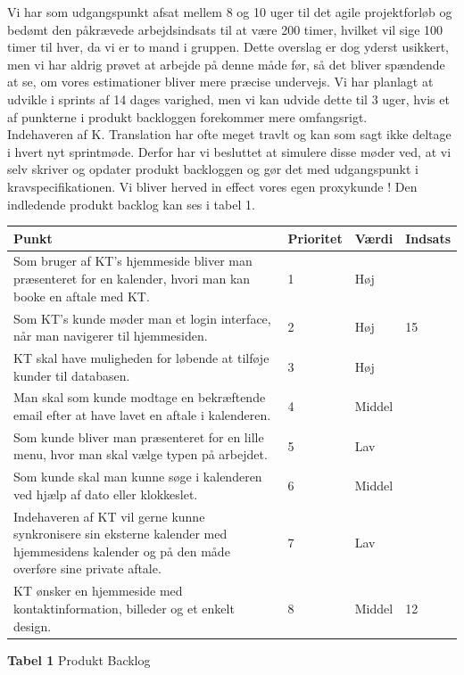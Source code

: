 \documentclass[12pt]{article}   %
\begin{document}
Vi har som udgangspunkt afsat mellem 8 og 10 uger til det agile projektforløb
og bedømt den påkrævede arbejdsindsats til at være 200 timer, hvilket vil sige 100
timer til hver, da vi er to mand i gruppen. Dette overslag er dog yderst
usikkert, men vi har aldrig prøvet at arbejde på denne måde før, så det bliver
spændende at se, om vores estimationer bliver mere præcise undervejs. Vi har
planlagt at udvikle i sprints af 14 dages varighed, men vi kan udvide dette til 3
uger, hvis et af punkterne i produkt backloggen forekommer mere omfangsrigt.\\
Indehaveren af K. Translation har ofte meget travlt og kan som sagt ikke
deltage i hvert nyt sprintmøde. Derfor har vi besluttet at simulere disse
møder ved, at vi selv skriver og opdater produkt backloggen og gør det med
udgangspunkt i kravspecifikationen. Vi bliver herved in effect vores egen 
proxykunde ! Den indledende produkt backlog kan ses i tabel 1.

\begin{center}
	\begin{tabular}{|p{8cm}|l|l|l|}
		\hline
Punkt & Prioritet & Værdi & Indsats \\ \hline
Som bruger af KT's hjemmeside bliver man præsenteret for en kalender, hvori man
kan booke en aftale med KT. & 1 & Høj &     \\ \hline
Som KT's kunde møder man et login interface, når man navigerer til hjemmesiden. & 2 &
Høj & 15  \\ \hline
KT skal have muligheden for løbende at tilføje kunder til databasen. & 3 & Høj
& \\ \hline
Man skal som kunde modtage en bekræftende email efter at have lavet en aftale
i kalenderen. & 4 & Middel &   \\ \hline
Som kunde bliver man præsenteret for en lille menu, hvor man skal vælge typen
på arbejdet. & 5 & Lav & \\ \hline
Som kunde skal man kunne søge i kalenderen ved hjælp af dato eller klokkeslet.
& 6  & Middel &   \\ \hline
Indehaveren af KT vil gerne kunne synkronisere sin eksterne kalender med
hjemmesidens kalender og på den måde overføre sine private aftale. & 7 & Lav &
\\ \hline
KT ønsker en hjemmeside med kontaktinformation, billeder og et enkelt design.
& 8 & Middel & 12 \\ \hline
\end{tabular}
\end{center}
\begin{center}\textbf{Tabel 1} Produkt Backlog
\end{center}
\vspace{0.5cm}
\end{document}
